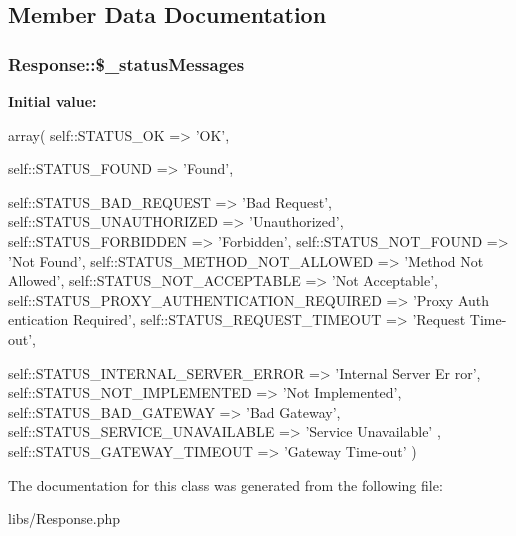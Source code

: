 \subsection{Member Data Documentation}
\hypertarget{classResponse_adaae8652ffaa94ea14955f926eaeefc9}{
\subsubsection[{\$\_\-statusMessages}]{\setlength{\rightskip}{0pt plus 5cm}Response::\$\_\-statusMessages}}
\label{classResponse_adaae8652ffaa94ea14955f926eaeefc9}
{\bfseries Initial value:}
\begin{DoxyCode}
 array(
                        self::STATUS_OK => 'OK',
                        
                        self::STATUS_FOUND => 'Found',
                        
                        self::STATUS_BAD_REQUEST => 'Bad Request',
                        self::STATUS_UNAUTHORIZED => 'Unauthorized',
                        self::STATUS_FORBIDDEN => 'Forbidden',
                        self::STATUS_NOT_FOUND => 'Not Found',
                        self::STATUS_METHOD_NOT_ALLOWED => 'Method Not Allowed',
                        self::STATUS_NOT_ACCEPTABLE => 'Not Acceptable',
                        self::STATUS_PROXY_AUTHENTICATION_REQUIRED => 'Proxy Auth
      entication Required',
                        self::STATUS_REQUEST_TIMEOUT => 'Request Time-out',
                        
                        self::STATUS_INTERNAL_SERVER_ERROR => 'Internal Server Er
      ror',
                        self::STATUS_NOT_IMPLEMENTED => 'Not Implemented',
                        self::STATUS_BAD_GATEWAY => 'Bad Gateway',
                        self::STATUS_SERVICE_UNAVAILABLE => 'Service Unavailable'
      ,
                        self::STATUS_GATEWAY_TIMEOUT => 'Gateway Time-out'
                )
\end{DoxyCode}


The documentation for this class was generated from the following file:\begin{DoxyCompactItemize}
\item 
libs/Response.php\end{DoxyCompactItemize}
